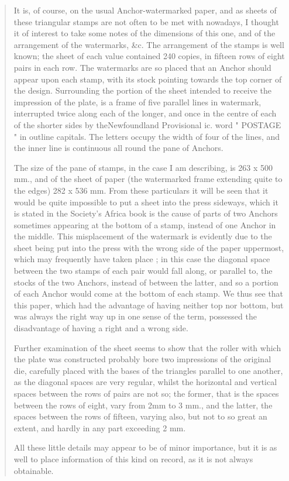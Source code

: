 \begin{quotation}
It is, of course, on the usual Anchor-watermarked paper, and as sheets of these
triangular stamps are not often to be met with nowadays, I thought it of interest to take some notes of the dimensions of this one, and of the arrangement of the watermarks, \&c. The arrangement of the stamps is well known; the sheet of each value contained 240 copies, in fifteen rows of eight pairs in each
row. The watermarks are so placed that an Anchor should appear upon
each stamp, with its stock pointing towards the top corner of the design. Surrounding the portion of the sheet intended to receive the impression of the
plate, is a frame of five parallel lines in watermark, interrupted twice along each of the longer, and once in the centre of each of the shorter sides by theNewfoundland Provisional ic. word " POSTAGE " in outline capitals. The letters occupy the width of four of the lines, and the inner line is continuous all round the pane of Anchors. 

The size of the pane of stamps, in the case I am describing, is 263 x 500 mm., and of the sheet of paper (the watermarked frame extending quite to the edges) 282 x 536 mm. From these particulars it will be seen that it would be quite impossible to put a sheet into the press sideways, which it is stated in the Society's Africa book is the cause of parts of two Anchors sometimes appearing at the bottom of a stamp, instead of one Anchor in the middle. This misplacement of the watermark is evidently due to the sheet being put
into the press with the wrong side of the paper uppermost, which may frequently have taken place ; in this case the diagonal space between the two stamps of each pair would fall along, or parallel to, the stocks of the two Anchors, instead of between the latter, and so a portion of each Anchor would come at the bottom of each stamp. We thus see that this paper, which had the advantage
of having neither top nor bottom, but was always the right way up in one sense
of the term, possessed the disadvantage of having a right and a wrong side. 

Further examination of the sheet seems to show that the roller with which
the plate was constructed probably bore two impressions of the original die, carefully placed with the bases of the triangles parallel to one another, as the diagonal spaces are very regular, whilst the horizontal and vertical spaces between the rows of pairs are not so; the former, that is the spaces between
the rows of eight, vary from 2mm to 3 mm., and the latter, the spaces between
the rows of fifteen, varying also, but not to so great an extent, and hardly in any part exceeding 2 mm.

All these little details may appear to be of minor importance, but it is as
well to place information of this kind on record, as it is not always obtainable.
\end{quotation}









               